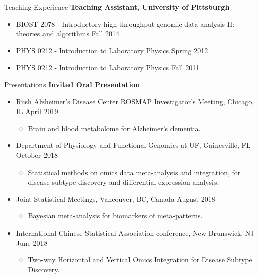 \documentclass{resume} %
\begin{document}
\begin{rSection}{Teaching Experience }
\textbf{Teaching Assistant, University of Pittsburgh}
\begin{itemize}[noitemsep,topsep=0pt]
\item BIOST 2078 - Introductory high-throughput genomic data analysis II: \\theories and algorithms \hfill {Fall 2014}
\item PHYS 0212 - Introduction to Laboratory Physics \hfill {Spring 2012}
\item PHYS 0212 - Introduction to Laboratory Physics \hfill {Fall 2011}
\end{itemize}

\end{rSection}

\begin{rSection}{Presentations}
\textbf{Invited Oral Presentation}

\begin{itemize}[noitemsep,topsep=0pt]

\item  Rush Alzheimer's Disease Center ROSMAP Investigator's Meeting, Chicago, IL  \hfill {April 2019}
\begin{itemize}[noitemsep,topsep=0pt]
\item{Brain and blood metabolome for Alzheimer's dementia.}
\end{itemize}

\item  Department of Physiology and Functional Genomics at UF, Gainesville, FL  \hfill {October 2018}
\begin{itemize}[noitemsep,topsep=0pt]
\item{Statistical methods on omics data meta-analysis and integration, for \\
disease subtype discovery and differential expression analysis.}
\end{itemize}

\item  Joint Statistical Meetings, Vancouver, BC, Canada  \hfill {August 2018}
\begin{itemize}[noitemsep,topsep=0pt]
\item{Bayesian meta-analysis for biomarkers of meta-patterns.}
\end{itemize}

\item  International Chinese Statistical Association conference, New Brunswick, NJ  \hfill {June 2018}
\begin{itemize}[noitemsep,topsep=0pt]
\item{Two-way Horizontal and Vertical Omics Integration for Disease Subtype Discovery.}
\end{itemize}



\end{itemize}
\end{rSection}
\end{document}
